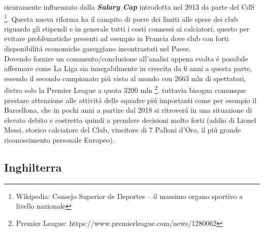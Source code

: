 \documentclass[
    corpo=12pt,
    oneside,
    evenboxes,
    tipotesi=triennale,
    stile=classica,
    oldstyle,
    autoretitolo,
    greek,
]{toptesi}
\begin{document}
\begin{interlinea}{1.5}
sicuramente influenzato dalla \emph{\textbf{Salary Cap}} introdotta nel 2013 da parte del CdS \footnote{Wikipedia: Consejo Superior de Deportes – il massimo organo sportivo a livello nazionale}.
Questa nuova riforma ha il campito di porre dei limiti alle spese dei club riguardo gli stipendi e in generale tutti i costi connessi ai calciatori,
questo per evitare problematiche presenti ad esempio in Francia dove club con forti disponibilit\'a economiche gareggiano incontrastati nel Paese.\\
Dovendo fornire un commento/conclusione all'analisi appena svolta \'e possibile affermare come La Liga sia innegabilmente in crescita da 6 
anni a questa parte, essendo il secondo campionato pi\'u visto al mondo con 2663 mln di spettatori, dietro solo la Premier League a quota 
3200 mln \footnote{Premier League: https://www.premierleague.com/news/1280062}, tuttavia bisogna comunque prestare attenzione alle attivit\'a
delle squadre pi\'u importanti come per esempio il Barcellona, che in pochi anni a partire dal 2018 si ritrover\'a in una situazione di
elevato debito e costretta quindi a prendere decisioni molto forti (addio di Lionel Messi, storico calciatore del Club, vincitore di 7 Palloni d'Oro,
il pi\'u grande riconoscimento personale Europeo).

\subsection{Inghilterra}



\end{interlinea}
\end{document}

